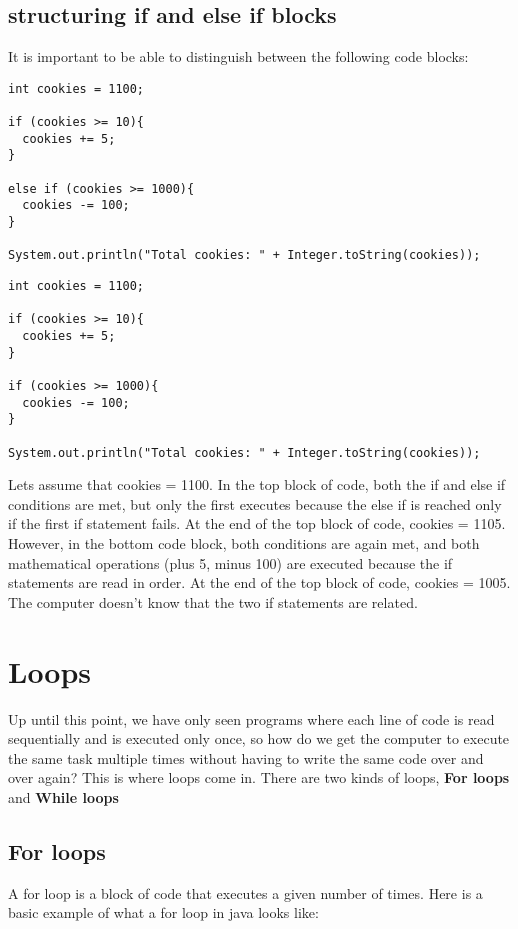 \documentclass[14pt]{extreport}%
\begin{document}
\subsection*{structuring if and else if blocks}
It is important to be able to distinguish between the following code blocks:
\begin{lstlisting}
int cookies = 1100;

if (cookies >= 10){
  cookies += 5;
}

else if (cookies >= 1000){
  cookies -= 100;
}

System.out.println("Total cookies: " + Integer.toString(cookies));
\end{lstlisting}{}

\begin{lstlisting}
int cookies = 1100;

if (cookies >= 10){
  cookies += 5;
}

if (cookies >= 1000){
  cookies -= 100;
}

System.out.println("Total cookies: " + Integer.toString(cookies));
\end{lstlisting}{}

Lets assume that cookies = 1100. In the top block of code, both the if and else if conditions are met, but only the first executes because the else if is reached only if the first if statement fails. At the end of the top block of code, cookies = 1105. However, in the bottom code block, both
conditions are again met, and both mathematical operations (plus 5, minus
100) are executed because the if statements are read in order. At the end of
the top block of code, cookies = 1005. The computer doesn't know
that the two if statements are related.
\section*{Loops}
Up until this point, we have only seen programs where each line of code is read sequentially and is executed only once, so how do we get the computer to execute the same task multiple times without having to write the same code over and over again? This is where loops come in. There are two kinds of loops, \textbf{For loops} and \textbf{While loops}

\subsection*{For loops }
A for loop is a block of code that executes a given number of times. Here is a basic example of what a for loop in java looks like:
\end{document}
